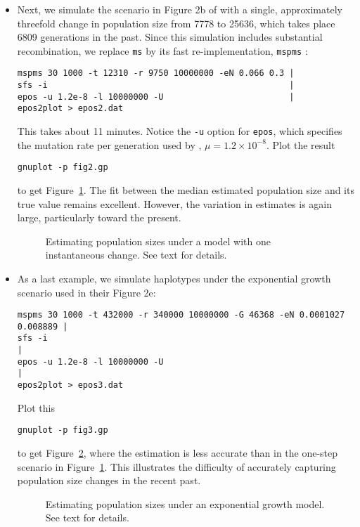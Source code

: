 \documentclass[a4paper]{article}
\newcommand{\ty}{\texttt}
\begin{document}
\begin{itemize}
\item Next, we simulate the scenario in Figure 2b of \cite{liu15:exp}
  with a single, approximately threefold change in population size
  from 7778 to 25636, which takes place 6809 generations in the
  past. Since this simulation includes substantial recombination, we
  replace \ty{ms} by its fast re-implementation, \ty{mspms}
  \citep{kel16:eff}:
\begin{verbatim}
mspms 30 1000 -t 12310 -r 9750 10000000 -eN 0.066 0.3 |
sfs -i                                                |
epos -u 1.2e-8 -l 10000000 -U                         |
epos2plot > epos2.dat
\end{verbatim}
This takes about 11 minutes. Notice the \ty{-u} option for \ty{epos},
which specifies the mutation rate per generation used by \cite{liu15:exp}, $\mu=1.2\times
10^{-8}$. Plot the result
\begin{verbatim}
gnuplot -p fig2.gp
\end{verbatim}
to get Figure~\ref{fig:2b}. The fit between the median estimated
population size and its true value remains excellent. However, the
variation in estimates is again large, particularly toward the present.
\begin{figure}
  \begin{center}
    \scalebox{0.6}{}
  \end{center}
  \caption{Estimating population sizes under a model with one
    instantaneous change. See text for details.}\label{fig:2b}
\end{figure}
\item As a last example, we simulate haplotypes under
  the exponential growth scenario \cite{liu15:exp} used in their
  Figure 2e:
    \small
\begin{verbatim}
mspms 30 1000 -t 432000 -r 340000 10000000 -G 46368 -eN 0.0001027 0.008889 |
sfs -i                                                                     |
epos -u 1.2e-8 -l 10000000 -U                                              |
epos2plot > epos3.dat
\end{verbatim}
\normalsize
Plot this
\begin{verbatim}
gnuplot -p fig3.gp
\end{verbatim}
to get Figure~\ref{fig:2e}, where the estimation is less
accurate than in the one-step scenario in Figure~\ref{fig:2b}.
This illustrates the difficulty of accurately capturing population size
changes in the recent past.
\begin{figure}
  \begin{center}
    \scalebox{0.6}{}
  \end{center}
  \caption{Estimating population sizes under an exponential growth
    model. See text for details.}\label{fig:2e}
\end{figure}
\end{itemize}
\end{document}
